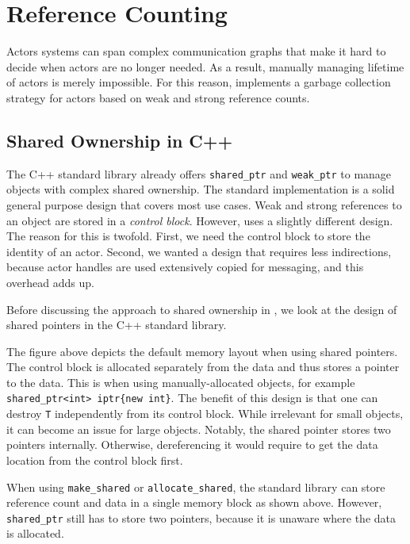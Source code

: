 \section{Reference Counting}
\label{reference-counting}

Actors systems can span complex communication graphs that make it hard to
decide when actors are no longer needed. As a result, manually managing
lifetime of actors is merely impossible. For this reason, \lib implements a
garbage collection strategy for actors based on weak and strong reference
counts.

\subsection{Shared Ownership in C++}

The C++ standard library already offers \lstinline^shared_ptr^ and
\lstinline^weak_ptr^ to manage objects with complex shared ownership. The
standard implementation is a solid general purpose design that covers most use
cases. Weak and strong references to an object are stored in a \emph{control
block}. However, \lib uses a slightly different design. The reason for this is
twofold. First, we need the control block to store the identity of an actor.
Second, we wanted a design that requires less indirections, because actor
handles are used extensively copied for messaging, and this overhead adds up.

Before discussing the approach to shared ownership in \lib, we look at the
design of shared pointers in the C++ standard library.


The figure above depicts the default memory layout when using shared pointers.
The control block is allocated separately from the data and thus stores a
pointer to the data. This is when using manually-allocated objects, for example
\lstinline^shared_ptr<int> iptr{new int}^. The benefit of this design is that
one can destroy \lstinline^T^ independently from its control block. While
irrelevant for small objects, it can become an issue for large objects.
Notably, the shared pointer stores two pointers internally. Otherwise,
dereferencing it would require to get the data location from the control block
first.


When using \lstinline^make_shared^ or \lstinline^allocate_shared^, the standard
library can store reference count and data in a single memory block as shown
above. However, \lstinline^shared_ptr^ still has to store two pointers, because
it is unaware where the data is allocated.

